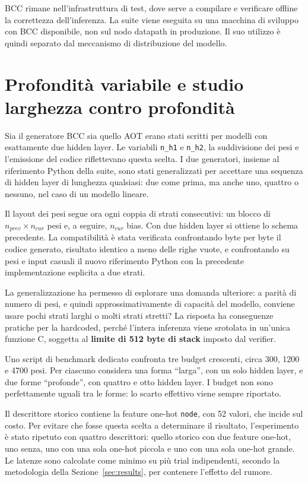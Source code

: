 \documentclass[binding=0.6cm,italian,oneside,noexaminfo]{sapthesis}
\begin{document}
BCC rimane nell'infrastruttura di test, dove serve a compilare e verificare offline la correttezza dell'inferenza. La suite viene eseguita su una macchina di sviluppo con BCC disponibile, non sul nodo datapath in produzione. Il suo utilizzo è quindi separato dal meccanismo di distribuzione del modello.

\section{Profondità variabile e studio larghezza contro profondità}
\label{sec:width-depth}

Sia il generatore BCC sia quello AOT erano stati scritti per modelli con esattamente due hidden layer. Le variabili \texttt{n\_h1} e \texttt{n\_h2}, la suddivisione dei pesi e l'emissione del codice riflettevano questa scelta. I due generatori, insieme al riferimento Python della suite, sono stati generalizzati per accettare una sequenza di hidden layer di lunghezza qualsiasi: due come prima, ma anche uno, quattro o nessuno, nel caso di un modello lineare.

Il layout dei pesi segue ora ogni coppia di strati consecutivi: un blocco di $n_{prev} \times n_{cur}$ pesi e, a seguire, $n_{cur}$ bias. Con due hidden layer si ottiene lo schema precedente. La compatibilità è stata verificata confrontando byte per byte il codice generato, risultato identico a meno delle righe vuote, e confrontando su pesi e input casuali il nuovo riferimento Python con la precedente implementazione esplicita a due strati.

La generalizzazione ha permesso di esplorare una domanda ulteriore: a parità di numero di pesi, e quindi approssimativamente di capacità del modello, conviene usare pochi strati larghi o molti strati stretti? La risposta ha conseguenze pratiche per la hardcoded, perché l'intera inferenza viene srotolata in un'unica funzione C, soggetta al \textbf{limite di 512 byte di stack} imposto dal verifier.

Uno script di benchmark dedicato confronta tre budget crescenti, circa 300, 1200 e 4700 pesi. Per ciascuno considera una forma ``larga'', con un solo hidden layer, e due forme ``profonde'', con quattro e otto hidden layer. I budget non sono perfettamente uguali tra le forme: lo scarto effettivo viene sempre riportato.

Il descrittore storico contiene la feature one-hot \texttt{node}, con 52 valori, che incide sul costo. Per evitare che fosse questa scelta a determinare il risultato, l'esperimento è stato ripetuto con quattro descrittori: quello storico con due feature one-hot, uno senza, uno con una sola one-hot piccola e uno con una sola one-hot grande. Le latenze sono calcolate come minimo su più trial indipendenti, secondo la metodologia della Sezione~\ref{sec:results}, per contenere l'effetto del rumore.
\end{document}
